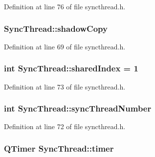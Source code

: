 Definition at line 76 of file syncthread.h.

\hypertarget{class_sync_thread_aa625d32e516a85a0c56fc2231ecc2916}{
\subsubsection[{shadowCopy}]{ {\bf SyncThread::shadowCopy}}}
\label{class_sync_thread_aa625d32e516a85a0c56fc2231ecc2916}


Definition at line 69 of file syncthread.h.

\hypertarget{class_sync_thread_a2097449d9c853c523c06d48141d80ecb}{
\subsubsection[{sharedIndex}]{\setlength{\rightskip}{0pt plus 5cm}int {\bf SyncThread::sharedIndex} = 1}}
\label{class_sync_thread_a2097449d9c853c523c06d48141d80ecb}


Definition at line 73 of file syncthread.h.

\hypertarget{class_sync_thread_a9500610685e61a7c4fcbc474a9afa642}{
\subsubsection[{syncThreadNumber}]{\setlength{\rightskip}{0pt plus 5cm}int {\bf SyncThread::syncThreadNumber}}}
\label{class_sync_thread_a9500610685e61a7c4fcbc474a9afa642}


Definition at line 72 of file syncthread.h.

\hypertarget{class_sync_thread_ac244e02c977cb8f5614bb2ff19ff1804}{
\subsubsection[{timer}]{\setlength{\rightskip}{0pt plus 5cm}QTimer {\bf SyncThread::timer}}}
\label{class_sync_thread_ac244e02c977cb8f5614bb2ff19ff1804}


